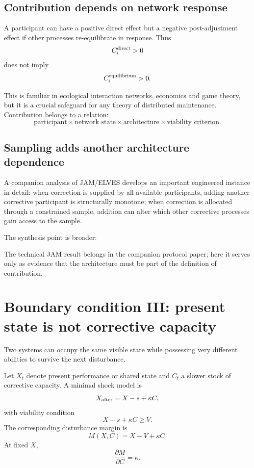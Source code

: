 \subsection{Contribution depends on network response}

A participant can have a positive direct effect but a negative post-adjustment effect if other processes re-equilibrate in response. Thus
\[
C_i^{\rm direct}>0
\]
does not imply
\[
C_i^{\rm equilibrium}>0.
\]

This is familiar in ecological interaction networks, economics and game theory, but it is a crucial safeguard for any theory of distributed maintenance. Contribution belongs to a relation:
\[
\boxed{
\text{participant}
\times
\text{network state}
\times
\text{architecture}
\times
\text{viability criterion}.
}
\]

\subsection{Sampling adds another architecture dependence}

A companion analysis of JAM/ELVES develops an important engineered instance in detail: when correction is supplied by all available participants, adding another corrective participant is structurally monotone; when correction is allocated through a constrained sample, addition can alter which other corrective processes gain access to the sample.

The synthesis point is broader:
\begin{center}
\end{center}
The technical JAM result belongs in the companion protocol paper; here it serves only as evidence that the architecture must be part of the definition of contribution.

\section{Boundary condition III: present state is not corrective capacity}

Two systems can occupy the same visible state while possessing very different abilities to survive the next disturbance.

Let \(X_t\) denote present performance or shared state and \(C_t\) a slower stock of corrective capacity. A minimal shock model is
\[
X_{\rm after}=X-s+\kappa C,
\]
with viability condition
\[
X-s+\kappa C\ge V.
\]
The corresponding disturbance margin is
\[
\boxed{
M(X,C)=X-V+\kappa C.
}
\]
At fixed \(X\),
\[
\frac{\partial M}{\partial C}=\kappa.
\]

